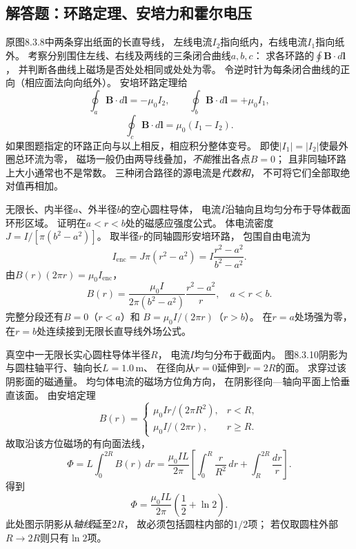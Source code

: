 
\subsection{解答题：环路定理、安培力和霍尔电压}

\problemtext 原图8.3.8中两条穿出纸面的长直导线，
左线电流$I_2$指向纸内，右线电流$I_1$指向纸外。
考察分别围住左线、右线及两线的三条闭合曲线$a,b,c$：
求各环路的$\oint\bm B\cdot d\bm l$，
并判断各曲线上磁场是否处处相同或处处为零。
\workings
令逆时针为每条闭合曲线的正向（相应面法向向纸外）。
安培环路定理给
\[
\boxed{\oint_a\bm B\cdot d\bm l=-\mu_0I_2},\qquad
\boxed{\oint_b\bm B\cdot d\bm l=+\mu_0I_1},
\]
\[
\boxed{\oint_c\bm B\cdot d\bm l=\mu_0(I_1-I_2)}.
\]
如果图题指定的环路正向与以上相反，相应积分整体变号。
即使$|I_1|=|I_2|$使最外圈总环流为零，
磁场一般仍由两导线叠加，\emph{不能}推出各点$B=0$；
且非同轴环路上大小通常也不是常数。
\crosscheck 三种闭合路径的源电流是\emph{代数和}，
不可将它们全部取绝对值再相加。

\problemtext 无限长、内半径$a$、外半径$b$的空心圆柱导体，
电流$I$沿轴向且均匀分布于导体截面环形区域。
证明在$a<r<b$处的磁感应强度公式。
\workings
体电流密度
$J=I/[\pi(b^2-a^2)]$。
取半径$r$的同轴圆形安培环路，
包围自由电流为
\[
I_{\mathrm{enc}}=J\pi(r^2-a^2)
=I\frac{r^2-a^2}{b^2-a^2}.
\]
由$B(r)(2\pi r)=\mu_0I_{\mathrm{enc}}$，
\[
\boxed{B(r)=\frac{\mu_0I}{2\pi(b^2-a^2)}
\frac{r^2-a^2}{r}},\quad a<r<b.
\]
完整分段还有$B=0$（$r<a$）和
$B=\mu_0I/(2\pi r)$（$r>b$）。
\crosscheck 在$r=a$处场强为零，在$r=b$处连续接到无限长直导线外场公式。

\problemtext 真空中一无限长实心圆柱导体半径$R$，
电流$I$均匀分布于截面内。
图8.3.10阴影为与圆柱轴平行、轴向长$L=1.0\,\mathrm m$、
在径向从$r=0$延伸到$r=2R$的面。
求穿过该阴影面的磁通量。
\workings
均匀体电流的磁场方位角方向，
在阴影径向—轴向平面上恰垂直该面。
由安培定理
\[
B(r)=
\begin{cases}
\mu_0Ir/(2\pi R^2),&r<R,\\
\mu_0I/(2\pi r),&r\ge R.
\end{cases}
\]
故取沿该方位磁场的有向面法线，
\[
\Phi=L\int_0^{2R}B(r)\,dr
=\frac{\mu_0IL}{2\pi}
\left[\int_0^R\frac r{R^2}\,dr+
\int_R^{2R}\frac{dr}{r}\right].
\]
得到
\[
\boxed{\Phi=\frac{\mu_0IL}{2\pi}
\left(\frac12+\ln2\right)}.
\]
\crosscheck 此处图示阴影从\emph{轴线}延至$2R$，
故必须包括圆柱内部的$1/2$项；
若仅取圆柱外部$R\to2R$则只有$\ln2$项。

